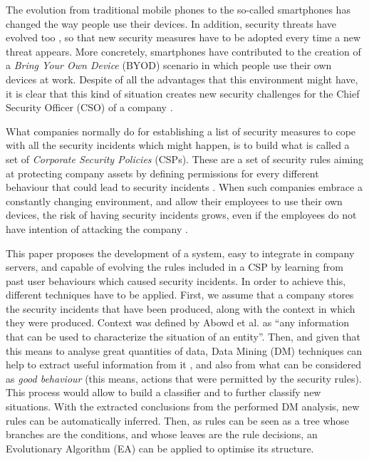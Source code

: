 \documentclass{sig-alternate}
\begin{document}
The evolution from traditional mobile phones to the so-called smartphones has changed the way people use their devices. In addition, security threats have evolved too \cite{gangula2013survey}, so that new security measures have to be adopted every time a new threat appears. More concretely, smartphones have contributed to the creation of a \textit{Bring Your Own Device} (BYOD) scenario in which people use their own devices at work. Despite of all the advantages that this environment might have, it is clear that this kind of situation creates new security challenges for the Chief Security Officer (CSO) of a company \cite{Opp_Security11}.

What companies normally do for establishing a list of security measures to cope with all the security incidents which might happen, is to build what is called a set of \textit{Corporate Security Policies} (CSPs). These are a set of security rules aiming at protecting company assets by defining permissions for every different behaviour that could lead to security incidents \cite{kaeo2003designing}. When such companies embrace a constantly changing environment, and allow their employees to use their own devices, the risk of having security incidents grows, even if the employees do not have intention of attacking the company \cite{stanton2005analysis, breivik2002abstract}.

This paper proposes the development of a system, easy to integrate in company servers, and capable of evolving the rules included in a CSP by learning from past user behaviours which caused security incidents. In order to achieve this, different techniques have to be applied. First, we assume that a company stores the security incidents that have been produced, along with the context in which they were produced. Context was defined by Abowd et al. \cite{abowd1999towards} as ``any information that can be used to characterize the situation of an entity''. Then, and given that this means to analyse great quantities of data, Data Mining (DM) techniques can help to extract useful information from it \cite{DeVel2001}, and also from what can be considered as \textit{good behaviour} (this means, actions that were permitted by the security rules). This process would allow to build a classifier and to further classify new situations. With the extracted conclusions from the performed DM analysis, new rules can be automatically inferred. Then, as rules can be seen as a tree whose branches are the conditions, and whose leaves are the rule decisions, an Evolutionary Algorithm (EA) can be applied to optimise its structure.
\end{document}

